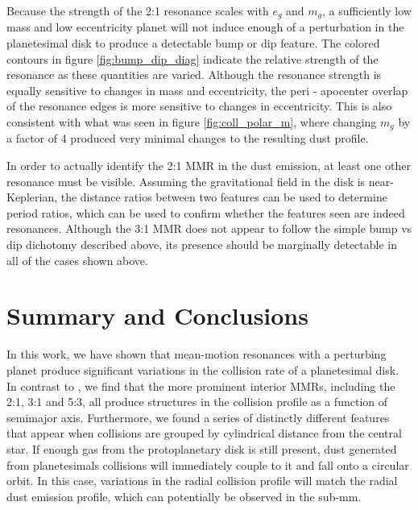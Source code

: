\documentclass[onecolumn]{aastex63}
\begin{document}
Because the strength of the 2:1 resonance scales with $e_{g}$ and  $m_{g}$, a sufficiently low mass and low eccentricity planet will not induce enough of a perturbation in the planetesimal disk to produce a detectable bump or dip feature. The colored contours in figure \ref{fig:bump_dip_diag} indicate the relative strength of the resonance as these quantities are varied. Although the resonance strength is equally sensitive to changes in mass and eccentricity, the peri - apocenter overlap of the resonance edges is more sensitive to changes in eccentricity. This is also consistent with what was seen in figure \ref{fig:coll_polar_m}, where changing $m_{g}$ by a factor of 4 produced very minimal changes to the resulting dust profile.

In order to actually identify the 2:1 MMR in the dust emission, at least one other resonance must be visible. Assuming the gravitational field in the disk is near-Keplerian, the distance ratios between two features can be used to determine period ratios, which can be used to confirm whether the features seen are indeed resonances. Although the 3:1 MMR does not appear to follow the simple bump vs dip dichotomy described above, its presence should be marginally detectable in all of the cases shown above.

\section{Summary and Conclusions}

In this work, we have shown that mean-motion resonances with a perturbing planet produce significant variations in the collision rate of a planetesimal disk. In contrast to \citet{2000Icar..143...45R}, we find that the more prominent interior MMRs, including the 2:1, 3:1 and 5:3, all produce structures in the collision profile as a function of semimajor axis. Furthermore, we found a series of distinctly different features that appear when collisions are grouped by cylindrical distance from the central star. If enough gas from the protoplanetary disk is still present, dust generated from planetesimals collisions will immediately couple to it and fall onto a circular orbit. In this case, variations in the radial collision profile will match the radial dust emission profile, which can potentially be observed in the sub-mm.
\end{document}
